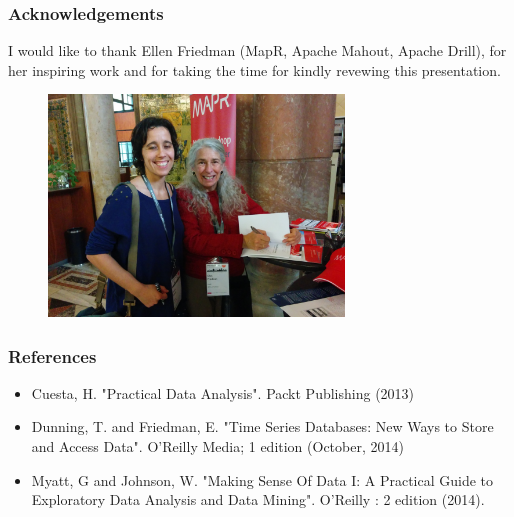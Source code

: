 \documentclass[hyperref={pdfpagelabels=true}]{beamer}
\begin{document}
\begin{frame}
\frametitle{Acknowledgements}
I would like to thank Ellen Friedman (MapR, Apache Mahout, Apache Drill), for her inspiring work and for taking the time for kindly revewing this presentation.
    \begin{figure}   
      \includegraphics[width=0.7\textwidth]{nosql_matters.jpg}      
    \end{figure}   
\end{frame}

\begin{frame}
\frametitle{References}
\begin{itemize}
\item Cuesta, H. "Practical Data Analysis". Packt Publishing (2013)
\item Dunning, T. and Friedman, E. "Time Series Databases: New Ways to Store and Access Data". O'Reilly Media; 1 edition (October, 2014)
\item Myatt, G and Johnson, W. "Making Sense Of Data I: A Practical Guide to Exploratory Data Analysis and Data Mining". O'Reilly : 2 edition (2014).
\end{itemize}
\end{frame}
\end{document}
